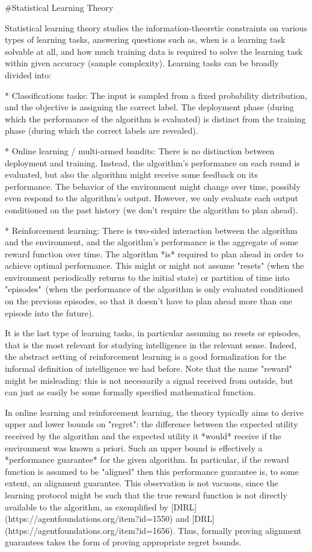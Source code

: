 \documentclass[a4paper]{article}
\begin{document}
\#Statistical Learning Theory

Statistical learning theory studies the information-theoretic constraints on various types of learning tasks, answering questions such as, when is a learning task solvable at all, and how much training data is required to solve the learning task within given accuracy (sample complexity). Learning tasks can be broadly divided into:

* Classifications tasks: The input is sampled from a fixed probability distribution, and the objective is assigning the correct label. The deployment phase (during which the performance of the algorithm is evaluated) is distinct from the training phase (during which the correct labels are revealed).

* Online learning / multi-armed bandits: There is no distinction between deployment and training. Instead, the algorithm's performance on each round is evaluated, but also the algorithm might receive some feedback on its performance. The behavior of the environment might change over time, possibly even respond to the algorithm's output. However, we only evaluate each output conditioned on the past history (we don't require the algorithm to plan ahead).

* Reinforcement learning: There is two-sided interaction between the algorithm and the environment, and the algorithm's performance is the aggregate of some reward function over time. The algorithm *is* required to plan ahead in order to achieve optimal performance. This might or might not assume "resets" (when the environment periodically returns to the initial state) or partition of time into "episodes"\ (when the performance of the algorithm is only evaluated conditioned on the previous episodes, so that it doesn't have to plan ahead more than one episode into the future).

It is the last type of learning tasks, in particular assuming no resets or episodes, that is the most relevant for studying intelligence in the relevant sense. Indeed, the abstract setting of reinforcement learning is a good formalization for the informal definition of intelligence we had before. Note that the name "reward" might be misleading: this is not necessarily a signal received from outside, but can just as easily be some formally specified mathematical function.

In online learning and reinforcement learning, the theory typically aims to derive upper and lower bounds on "regret": the difference between the expected utility received by the algorithm and the expected utility it *would* receive if the environment was known a priori. Such an upper bound is effectively a *performance guarantee* for the given algorithm. In particular, if the reward function is assumed to be "aligned" then this performance guarantee is, to some extent, an alignment guarantee. This observation is not vacuous, since the learning protocol might be such that the true reward function is not directly available to the algorithm, as exemplified by [DIRL](https://agentfoundations.org/item?id=1550) and [DRL](https://agentfoundations.org/item?id=1656). Thus, formally proving alignment guarantees takes the form of proving appropriate regret bounds.
\end{document}
